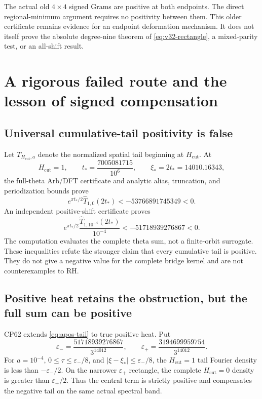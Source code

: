 \documentclass[11pt]{article}
\theoremstyle{definition}
\theoremstyle{remark}
\begin{document}
The actual old $4\times4$ signed Grams are positive at both endpoints. The
direct regional-minimum argument requires no positivity between them. This
older certificate remains evidence for an endpoint deformation mechanism. It
does not itself prove the absolute degree-nine theorem of
\eqref{eq:v32-rectangle}, a mixed-parity test, or an all-shift result.

\section{A rigorous failed route and the lesson of signed compensation}

\subsection{Universal cumulative-tail positivity is false}

Let $T_{H_{\mathrm{cut}},a}$ denote the normalized spatial tail beginning at
$H_{\mathrm{cut}}$. At
\begin{equation}
 H_{\mathrm{cut}}=1,\qquad t_*=\frac{7005081715}{10^6},\qquad
 \xi_*=2t_*=14010.16343,
\end{equation}
the full-theta Arb/DFT certificate and analytic alias, truncation, and
periodization bounds prove
\begin{equation}
 e^{\pi t_*/2}\widehat T_{1,0}(2t_*)<-53766891745349<0.
 \label{eq:a0-tail}
\end{equation}
An independent positive-shift certificate proves
\begin{equation}
 e^{\pi t_*/2}\frac{\widehat T_{1,10^{-4}}(2t_*)}{10^{-4}}
 <-51718939276867<0.
 \label{eq:apos-tail}
\end{equation}
The computation evaluates the complete theta sum, not a finite-orbit
surrogate. These inequalities refute the stronger claim that every cumulative
tail is positive. They do not give a negative value for the complete bridge
kernel and are not counterexamples to RH.

\subsection{Positive heat retains the obstruction, but the full sum can be positive}

CP62 extends \eqref{eq:apos-tail} to true positive heat. Put
\begin{equation}
 \varepsilon_- =\frac{51718939276867}{3^{14012}},\qquad
 \varepsilon_+ =\frac{3194699959754}{3^{14012}}.
\end{equation}
For $a=10^{-4}$, $0\le\tau\le\varepsilon_-/8$, and
$|\xi-\xi_*|\le\varepsilon_-/8$, the $H_{\mathrm{cut}}=1$ tail Fourier density is less than
$-\varepsilon_-/2$. On the narrower $\varepsilon_+$ rectangle, the complete
$H_{\mathrm{cut}}=0$ density is greater than $\varepsilon_+/2$. Thus the central term is
strictly positive and compensates the negative tail on the same actual
spectral band.
\end{document}
